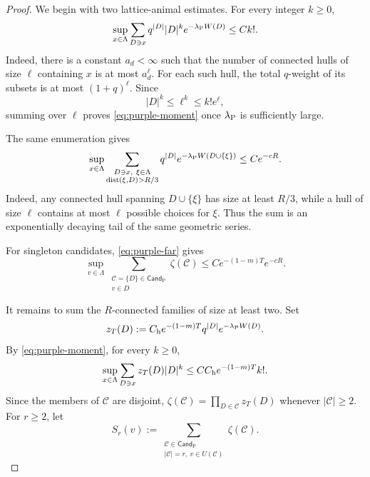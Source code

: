 \documentclass[letterpaper,11pt,reqno]{amsart}
\theoremstyle{definition}
\begin{document}
\begin{proof}

We begin with two lattice-animal estimates. For every integer \(k\ge0\),
\begin{equation}
\label{eq:purple-moment}
        \sup_{x\in\Lambda}
        \sum_{D\ni x}
        q^{|D|}|D|^k e^{-\lambda_{\rm P}W(D)}
        \le Ck!.
\end{equation}
Indeed, there is a constant \(a_d<\infty\) such that the number of
connected hulls of size \(\ell\) containing \(x\) is at most
\(a_d^\ell\). For each such hull, the total \(q\)-weight of its subsets
is at most \((1+q)^\ell\). Since
\[
        |D|^k\le \ell^k\le k!e^\ell,
\]
summing over \(\ell\) proves \eqref{eq:purple-moment} once
\(\lambda_{\rm P}\) is sufficiently large.

The same enumeration gives
\begin{equation}
\label{eq:purple-far}
        \sup_{x\in\Lambda}
        \sum_{\substack{D\ni x,\ \xi\in\Lambda\\
                        \operatorname{dist}(\xi,D)>R/3}}
        q^{|D|}e^{-\lambda_{\rm P}W(D\cup\{\xi\})}
        \le Ce^{-cR}.
\end{equation}
Indeed, any connected hull spanning \(D\cup\{\xi\}\) has size at least
\(R/3\), while a hull of size \(\ell\) contains at most \(\ell\) possible
choices for \(\xi\). Thus the sum is an exponentially decaying tail of the
same geometric series.

For singleton candidates, \eqref{eq:purple-far} gives
\begin{equation}
\label{eq:purple-long-sum}
        \sup_{v\in\Lambda}
        \sum_{\substack{\mathcal C=\{D\}\in\mathsf{Cand}_{\mathrm P}\\
                        v\in D}}
        \zeta(\mathcal C)
        \le
        Ce^{-(1-m)T}e^{-cR}.
\end{equation}

It remains to sum the \(R\)-connected families of size at least two. Set
\[
        z_T(D):=C_{\rm h}e^{-(1-m)T}q^{|D|}e^{-\lambda_{\rm P}W(D)}.
\]
By \eqref{eq:purple-moment}, for every \(k\ge0\),
\begin{equation}
\label{eq:purple-weighted-moment}
        \sup_{x\in\Lambda}
        \sum_{D\ni x}z_T(D)|D|^k
        \le CC_{\rm h}e^{-(1-m)T}k!.
\end{equation}
Since the members of \(\mathcal C\) are disjoint,
\(\zeta(\mathcal C)=\prod_{D\in\mathcal C}z_T(D)\) whenever
\(|\mathcal C|\ge2\). For \(r\ge2\), let
\[
        S_r(v):=
        \sum_{\substack{\mathcal C\in\mathsf{Cand}_{\mathrm P}\\
                        |\mathcal C|=r,\ v\in U(\mathcal C)}}
        \zeta(\mathcal C).
\]


\end{proof}
\end{document}
